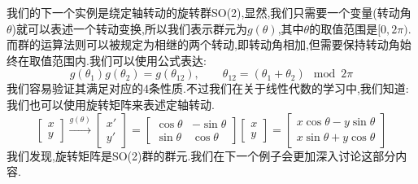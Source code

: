 \begin{example}
    我们的下一个实例是绕定轴转动的旋转群SO(2),显然,我们只需要一个变量(转动角$\theta$)就可以表述一个转动变换,所以我们表示群元为$g(\theta)$,其中$\theta$的取值范围是$[0,2\pi)$.而群的运算法则可以被规定为相继的两个转动,即转动角相加,但需要保持转动角始终在取值范围内.我们可以使用公式表达:
    \begin{equation}
        g(\theta_1)g(\theta_2)=g(\theta_{12}),\qquad\theta_{12}=(\theta_1+\theta_2)\mod 2\pi
    \end{equation}
    我们容易验证其满足对应的4条性质.不过我们在关于线性代数的学习中,我们知道:我们也可以使用旋转矩阵来表述定轴转动.
    \begin{equation}
        \begin{bmatrix}x\\y\end{bmatrix}\xrightarrow{g(\theta)}\begin{bmatrix}x'\\y'\end{bmatrix}=\begin{bmatrix}\cos\theta&-\sin\theta\\\sin\theta&\cos\theta\end{bmatrix}\begin{bmatrix}x\\y\end{bmatrix}=\begin{bmatrix}x\cos\theta-y\sin\theta\\x\sin\theta+y\cos\theta\end{bmatrix}
    \end{equation}
    我们发现,旋转矩阵是SO(2)群的群元.我们在下一个例子会更加深入讨论这部分内容.
\end{example}
